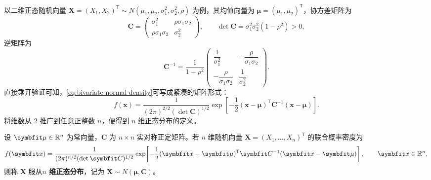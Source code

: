 以二维正态随机向量 $\bm{X}=(X_1,X_2)^{\mathsf{T}}\sim N(\mu_1,\mu_2,\sigma_1^2,\sigma_2^2,\rho)$ 为例，其均值向量为 $\bm{\mu}=(\mu_1,\mu_2)^{\mathsf{T}}$，协方差矩阵为
\[
  \bm{C}=
  \begin{pmatrix}
    \sigma_1^2 & \rho\sigma_1\sigma_2 \\
    \rho\sigma_1\sigma_2 & \sigma_2^2
  \end{pmatrix},
  \qquad
  \det\bm{C}=\sigma_1^2\sigma_2^2(1-\rho^2)>0,
\]
逆矩阵为
\[
  \bm{C}^{-1}=\frac{1}{1-\rho^2}
  \begin{pmatrix}
    \dfrac{1}{\sigma_1^2} & -\dfrac{\rho}{\sigma_1\sigma_2} \\[8pt]
    -\dfrac{\rho}{\sigma_1\sigma_2} & \dfrac{1}{\sigma_2^2}
  \end{pmatrix}.
\]
直接乘开验证可知，\eqref{eq:bivariate-normal-density}可写成紧凑的矩阵形式：
\[
  f(\bm{x})=\frac{1}{(2\pi)^{2/2}(\det\bm{C})^{1/2}}
  \exp\!\left[-\frac{1}{2}(\bm{x}-\bm{\mu})^{\mathsf{T}}\bm{C}^{-1}(\bm{x}-\bm{\mu})\right].
\]
将维数从 $2$ 推广到任意正整数 $n$，便得到 $n$ 维正态分布的定义。

\begin{definition}[$n$ 维正态分布]
\label{def:multivariate-normal}
设 $\bm{\mu}\in\R^n$ 为常向量，$\bm{C}$ 为 $n\times n$ 实对称正定矩阵。若 $n$ 维随机向量 $\bm{X}=(X_1,\ldots,X_n)^{\mathsf{T}}$ 的联合概率密度为
\begin{equation}
  f(\bm{x})=\frac{1}{(2\pi)^{n/2}(\det\bm{C})^{1/2}}
  \exp\!\left[-\frac{1}{2}(\bm{x}-\bm{\mu})^{\mathsf{T}}\bm{C}^{-1}(\bm{x}-\bm{\mu})\right],
  \qquad \bm{x}\in\R^n,
  \label{eq:mvn-density}
\end{equation}
则称 $\bm{X}$ 服从\textbf{$n$ 维正态分布}，记为 $\bm{X}\sim N(\bm{\mu},\bm{C})$。
\end{definition}

